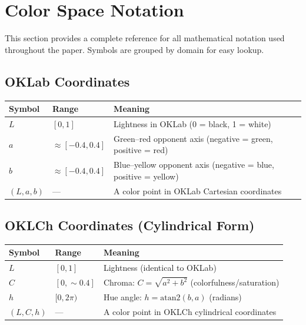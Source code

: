
\section{Color Space Notation}
\label{sec:notation-color}

This section provides a complete reference for all mathematical notation used throughout the paper. Symbols are grouped by domain for easy lookup.

\subsection{OKLab Coordinates}

\begin{center}
\begin{tabular}{lll}
  \toprule
  \textbf{Symbol} & \textbf{Range} & \textbf{Meaning} \\
  \midrule
  $L$ & $[0, 1]$ & Lightness in OKLab (0 = black, 1 = white) \\
  $a$ & $\approx [-0.4, 0.4]$ & Green--red opponent axis (negative = green, positive = red) \\
  $b$ & $\approx [-0.4, 0.4]$ & Blue--yellow opponent axis (negative = blue, positive = yellow) \\
  $(L, a, b)$ & --- & A color point in OKLab Cartesian coordinates \\
  \bottomrule
\end{tabular}
\end{center}

\subsection{OKLCh Coordinates (Cylindrical Form)}

\begin{center}
\begin{tabular}{lll}
  \toprule
  \textbf{Symbol} & \textbf{Range} & \textbf{Meaning} \\
  \midrule
  $L$ & $[0, 1]$ & Lightness (identical to OKLab) \\
  $C$ & $[0, \sim 0.4]$ & Chroma: $C = \sqrt{a^2 + b^2}$ (colorfulness/saturation) \\
  $h$ & $[0, 2\pi)$ & Hue angle: $h = \mathrm{atan2}(b, a)$ (radians) \\
  $(L, C, h)$ & --- & A color point in OKLCh cylindrical coordinates \\
  \bottomrule
\end{tabular}
\end{center}

